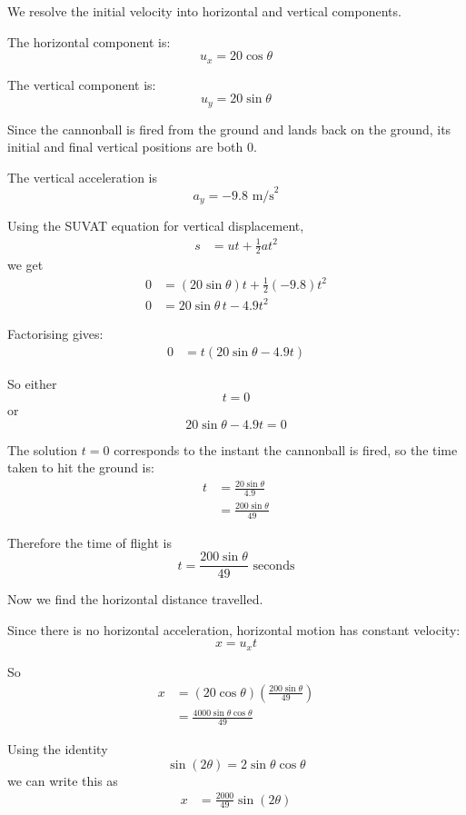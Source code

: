\begin{solution}
We resolve the initial velocity into horizontal and vertical components.

The horizontal component is:
\[
u_x = 20\cos\theta
\]

The vertical component is:
\[
u_y = 20\sin\theta
\]

Since the cannonball is fired from the ground and lands back on the ground, its initial and final vertical positions are both $0$.

The vertical acceleration is
\[
a_y = -9.8 \text{ m/s}^2
\]

Using the SUVAT equation for vertical displacement,
\begin{align*}
    s &= ut + \frac{1}{2}at^2
\end{align*}
we get
\begin{align*}
    0 &= (20\sin\theta)t + \frac{1}{2}(-9.8)t^2 \\
    0 &= 20\sin\theta \, t - 4.9t^2
\end{align*}

Factorising gives:
\begin{align*}
    0 &= t(20\sin\theta - 4.9t)
\end{align*}

So either
\[
t=0
\]
or
\[
20\sin\theta - 4.9t = 0
\]

The solution $t=0$ corresponds to the instant the cannonball is fired, so the time taken to hit the ground is:
\begin{align*}
    t &= \frac{20\sin\theta}{4.9} \\
      &= \frac{200\sin\theta}{49}
\end{align*}

Therefore the time of flight is
\[
{t = \frac{200\sin\theta}{49}\text{ seconds}}
\]

Now we find the horizontal distance travelled.

Since there is no horizontal acceleration, horizontal motion has constant velocity:
\[
x = u_xt
\]

So
\begin{align*}
    x &= (20\cos\theta)\left(\frac{200\sin\theta}{49}\right) \\
      &= \frac{4000\sin\theta\cos\theta}{49}
\end{align*}

Using the identity
\[
\sin(2\theta)=2\sin\theta\cos\theta
\]
we can write this as
\begin{align*}
    x &= \frac{2000}{49}\sin(2\theta)
\end{align*}


\end{solution}
